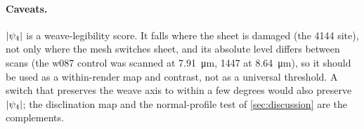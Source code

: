 \paragraph{Caveats.} $|\psi_4|$ is a weave-legibility score. It falls where the sheet is damaged (the 4144 site), not only where the mesh switches sheet, and its absolute level differs between scans (the w087 control was scanned at \SI{7.91}{\um}, 1447 at \SI{8.64}{\um}), so it should be used as a within-render map and contrast, not as a universal threshold. A switch that preserves the weave axis to within a few degrees would also preserve $|\psi_4|$; the disclination map and the normal-profile test of \cref{sec:discussion} are the complements.


